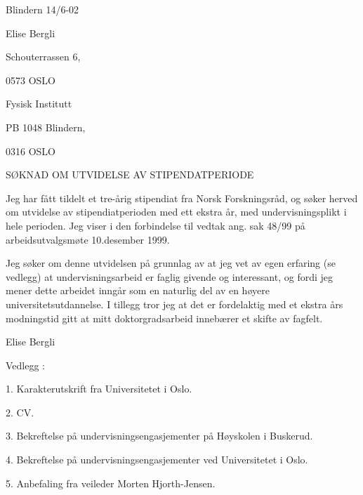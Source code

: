 \documentclass[12pt]{report}
\begin{document}
\thispagestyle{empty}

\hspace{9cm}Blindern 14/6-02

\vspace{5mm}

Elise Bergli

Schouterrassen 6,

0573 OSLO

\vspace{10mm}

Fysisk Institutt

PB 1048 Blindern, 

0316 OSLO


\vspace{20mm}

S{\O}KNAD OM UTVIDELSE AV STIPENDATPERIODE 

\vspace{10mm}

Jeg har f{\aa}tt tildelt et tre-{\aa}rig stipendiat fra Norsk Forskningsr{\aa}d, og s{\o}ker herved om utvidelse av stipendiatperioden med ett ekstra {\aa}r, med undervisningsplikt i hele perioden. Jeg viser i den forbindelse til vedtak ang. sak 48/99 p{\aa} arbeidsutvalgsm{\o}te 10.desember 1999.

\vspace{5mm}

Jeg s{\o}ker om denne utvidelsen p{\aa} grunnlag av at jeg vet av egen erfaring (se vedlegg) at undervisningsarbeid er faglig givende og interessant, og fordi jeg mener dette arbeidet inng{\aa}r som en naturlig del av en h{\o}yere universitetsutdannelse. I tillegg tror jeg at det er fordelaktig med et ekstra {\aa}rs modningstid gitt at mitt doktorgradsarbeid inneb{\ae}rer et skifte av fagfelt.

\vspace{20mm}

Elise Bergli

\vspace{10mm}

Vedlegg :

\begin{description}
\item{1. Karakterutskrift fra Universitetet i Oslo.}
\item{2. CV.}
\item{3. Bekreftelse p{\aa} undervisningsengasjementer p{\aa} H{\o}yskolen i Buskerud.}
\item{4. Bekreftelse p{\aa} undervisningsengasjementer ved Universitetet i Oslo.}
\item{5. Anbefaling fra veileder Morten Hjorth-Jensen.}
\end{description}
\end{document}
